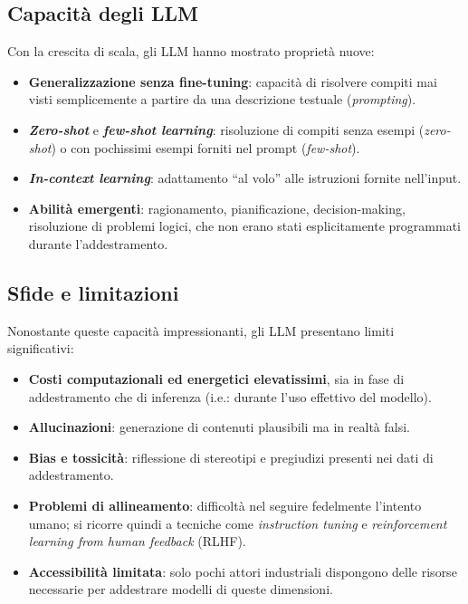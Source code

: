 \subsection{Capacità degli LLM}
Con la crescita di scala, gli LLM hanno mostrato proprietà nuove:
\begin{itemize}
    \item \textbf{Generalizzazione senza fine-tuning}: capacità di risolvere compiti mai visti 
    semplicemente a partire da una descrizione testuale (\textit{prompting}).
    \item \textbf{\textit{Zero-shot}} e \textbf{\textit{few-shot learning}}: risoluzione di compiti senza esempi (\textit{zero-shot}) 
    o con pochissimi esempi forniti nel prompt (\textit{few-shot}).
    \cite{chung2022scaling}\cite{sanh2021multitask}\cite{wang2022supernaturalinstructions}\cite{wang2022selfinstruct}\cite{ouyang2022rlhf}\cite{touvron2023llama2}
    \item \textbf{\textit{In-context learning}}: adattamento “al volo” alle istruzioni fornite nell'input.
    \item \textbf{Abilità emergenti}: ragionamento, pianificazione, decision-making, risoluzione di problemi logici,
    che non erano stati esplicitamente programmati durante l'addestramento.
    \cite{wei2022emergent}\cite{webb2023emergent}\cite{boiko2023emergent}
\end{itemize}

\subsection{Sfide e limitazioni}
Nonostante queste capacità impressionanti, gli LLM presentano limiti significativi:
\begin{itemize}
    \item \textbf{Costi computazionali ed energetici elevatissimi}, sia in fase di addestramento che di inferenza 
    (i.e.: durante l'uso effettivo del modello).
    \item \textbf{Allucinazioni}: generazione di contenuti plausibili ma in realtà falsi.
    \item \textbf{Bias e tossicità}: riflessione di stereotipi e pregiudizi presenti nei dati di addestramento.
    \item \textbf{Problemi di allineamento}: difficoltà nel seguire fedelmente l'intento umano; 
    si ricorre quindi a tecniche come \textit{instruction tuning} e \textit{reinforcement learning from human feedback} (RLHF).
    \item \textbf{Accessibilità limitata}: solo pochi attori industriali dispongono delle risorse necessarie 
    per addestrare modelli di queste dimensioni.
\end{itemize}

